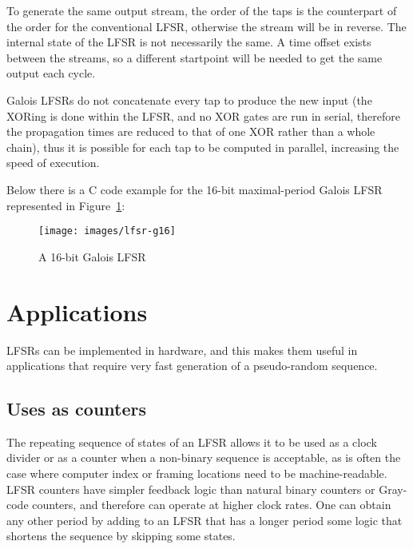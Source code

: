 \documentclass[11pt,a4paper,oneside, openright]{article}
\begin{document}
To generate the same output stream, the order of the taps is the counterpart of the order for the conventional LFSR, otherwise the stream will be in reverse. The internal state of the LFSR is not necessarily the same. A time offset exists between the streams, so a different startpoint will be needed to get the same output each cycle.

Galois LFSRs do not concatenate every tap to produce the new input (the XORing is done within the LFSR, and no XOR gates are run in serial, therefore the propagation times are reduced to that of one XOR rather than a whole chain), thus it is possible for each tap to be computed in parallel, increasing the speed of execution.

Below there is a C code example for the 16-bit maximal-period Galois LFSR represented in Figure~\ref{fig:lfsr-g16}:



\begin{figure}
    \centering
    \texttt{[image: images/lfsr-g16]}
    \caption{A 16-bit Galois LFSR}
    \label{fig:lfsr-g16}
\end{figure}

\section{Applications}
LFSRs can be implemented in hardware, and this makes them useful in applications that require very fast generation of a pseudo-random sequence.

\subsection{Uses as counters}
The repeating sequence of states of an LFSR allows it to be used as a clock divider or as a counter when a non-binary sequence is acceptable, as is often the case where computer index or framing locations need to be machine-readable. LFSR counters have simpler feedback logic than natural binary counters or Gray-code counters, and therefore can operate at higher clock rates. One can obtain any other period by adding to an LFSR that has a longer period some logic that shortens the sequence by skipping some states.
\end{document}
